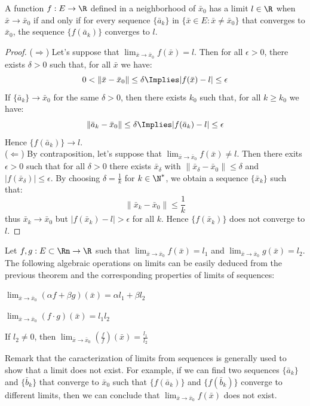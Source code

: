 \begin{theorem}
    A function $f: E \to \R$ defined in a neighborhood of $\bar{x}_0$ has a limit $l \in \R$ when $\bar{x} \to \bar{x}_0$ if and only if for every sequence $\{\bar{a}_k\}$ in $\{\bar{x} \in E : \bar{x} \neq \bar{x}_0\}$ that converges to $\bar{x}_0$, the sequence $\{f(\bar{a}_k)\}$ converges to $l$.
\end{theorem}
\begin{proof}
    ($\Rightarrow$) Let's suppose that $\lim_{\bar{x} \to \bar{x}_0} f(\bar{x}) = l$. Then for all $\epsilon > 0$, there exists $\delta > 0$ such that, for all $\bar{x}$ we have:
    \[
        0 < \|\bar{x} - \bar{x}_0 \| \leq \delta \Implies |f(\bar{x}) - l| \leq \epsilon
    \]
    If $\{\bar{a}_k\} \to \bar{x}_0$ for the same $\delta > 0$, then there exists $k_0$ such that, for all $k \geq k_0$ we have: 
    \[
        \| \bar{a}_k - \bar{x}_0 \| \leq \delta \Implies |f(\bar{a}_k) - l| \leq \epsilon
    \]
    Hence $\{f(\bar{a}_k)\} \to l$. \\
    ($\Leftarrow$) By contraposition, let's suppose that $\lim_{\bar{x} \to \bar{x}_0} f(\bar{x}) \neq l$. Then there exits $\epsilon > 0$ such that for all $\delta > 0$ there exists $\bar{x}_\delta$ with $\|\bar{x}_\delta - \bar{x}_0\| \leq \delta$ and $|f(\bar{x}_\delta)| \leq \epsilon$. By choosing $\delta = \frac{1}{k}$ for $k \in \N^*$, we obtain a sequence $\{\bar{x}_k\}$ such that:
    \[
        \| \bar{x}_k - \bar{x}_0 \| \leq \frac{1}{k}
    \]
    thus $\bar{x}_k \to \bar{x}_0$ but $|f(\bar{x}_k) - l| > \epsilon$ for all $k$. Hence $\{f(\bar{x}_k)\}$ does not converge to $l$.
\end{proof}
Let $f,g: E \subset \Rn \to \R$ such that $\lim_{\bar{x} \to \bar{x}_0} f(\bar{x}) = l_1$ and $\lim_{\bar{x} \to \bar{x}_0} g(\bar{x}) = l_2$. The following algebraic operations on limits can be easily deduced from the previous theorem and the corresponding properties of limits of sequences:
\begin{citemize}
    \item $\lim_{\bar{x} \to \bar{x}_0} (\alpha f + \beta g)(\bar{x}) = \alpha l_1 + \beta l_2$
    \item $\lim_{\bar{x} \to \bar{x}_0} (f \cdot g)(\bar{x}) = l_1l_2$ 
    \item If $l_2 \neq 0$, then $\lim_{\bar{x} \to \bar{x}_0} \left(\frac{f}{f}\right) (\bar{x}) = \frac{l_1}{l_2}$
\end{citemize}
Remark that the caracterization of limits from sequences is generally used to show that a limit does not exist. For example, if we can find two sequences $\{\bar{a}_k\}$ and $\{\bar{b}_k\}$ that converge to $\bar{x}_0$ such that $\{f(\bar{a}_k)\}$ and $\{f(\bar{b}_k)\}$ converge to different limits, then we can conclude that $\lim_{\bar{x} \to \bar{x}_0} f(\bar{x})$ does not exist.

